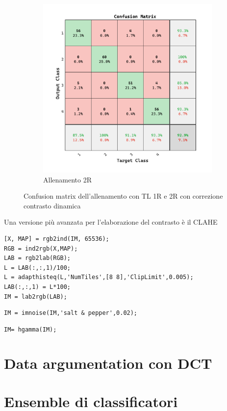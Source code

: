 \begin{figure}[ht]
\begin{subfigure}{0.45\textwidth}
        \includegraphics[width=\textwidth]{addestramento-rete-neurale/two-contrast-bis.pdf}
        \caption{Allenamento 2R} 
    \end{subfigure}
    \caption{Confusion matrix dell'allenamento con TL 1R e 2R con correzione contrasto dinamica}
    \label{fig:contrast-bis}
\end{figure}

Una versione più avanzata per l'elaborazione del contrasto è il CLAHE

\begin{lstlisting}
[X, MAP] = rgb2ind(IM, 65536);
RGB = ind2rgb(X,MAP);
LAB = rgb2lab(RGB);
L = LAB(:,:,1)/100;
L = adapthisteq(L,'NumTiles',[8 8],'ClipLimit',0.005);
LAB(:,:,1) = L*100;
IM = lab2rgb(LAB);
\end{lstlisting}

\begin{lstlisting}
IM = imnoise(IM,'salt & pepper',0.02);
\end{lstlisting}

\begin{lstlisting}
IM= hgamma(IM);
\end{lstlisting}

\section{Data argumentation con DCT}\label{data-argumentation-con-dct}





\section{Ensemble di classificatori}\label{ensemble-di-classificatori}

